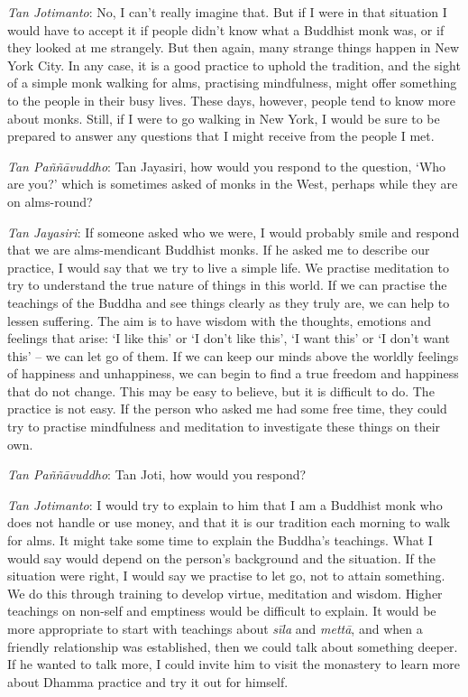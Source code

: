 \emph{Tan Jotimanto}: No, I can't really imagine that. But if I were in
that situation I would have to accept it if people didn't know what a
Buddhist monk was, or if they looked at me strangely. But then again, 
many strange things happen in New York City. In any case, it is a good
practice to uphold the tradition, and the sight of a simple monk walking
for alms, practising mindfulness, might offer something to the people in
their busy lives. These days, however, people tend to know more about
monks. Still, if I were to go walking in New York, I would be sure to be
prepared to answer any questions that I might receive from the people I
met. 

\emph{Tan Paññāvuddho}: Tan Jayasiri, how would you respond to the
question, `Who are you?' which is sometimes asked of monks in the West, 
perhaps while they are on alms-round? 

\emph{Tan Jayasiri}: If someone asked who we were, I would probably
smile and respond that we are alms-mendicant Buddhist monks. If he asked
me to describe our practice, I would say that we try to live a simple
life. We practise meditation to try to understand the true nature of
things in this world. If we can practise the teachings of the Buddha and
see things clearly as they truly are, we can help to lessen suffering. 
The aim is to have wisdom with the thoughts, emotions and feelings that
arise: `I like this' or `I don't like this', `I want this' or `I don't
want this' -- we can let go of them. If we can keep our minds above the
worldly feelings of happiness and unhappiness, we can begin to find a
true freedom and happiness that do not change. This may be easy to
believe, but it is difficult to do. The practice is not easy. If the
person who asked me had some free time, they could try to practise
mindfulness and meditation to investigate these things on their own. 

\emph{Tan Paññāvuddho}: Tan Joti, how would you respond? 

\emph{Tan Jotimanto}: I would try to explain to him that I am a Buddhist
monk who does not handle or use money, and that it is our tradition each
morning to walk for alms. It might take some time to explain the
Buddha's teachings. What I would say would depend on the person's
background and the situation. If the situation were right, I would say
we practise to let go, not to attain something. We do this through
training to develop virtue, meditation and wisdom. Higher teachings on
non-self and emptiness would be difficult to explain. It would be more
appropriate to start with teachings about \emph{sīla} and \emph{mettā}, 
and when a friendly relationship was established, then we could talk
about something deeper. If he wanted to talk more, I could invite him to
visit the monastery to learn more about Dhamma practice and try it out
for himself. 

